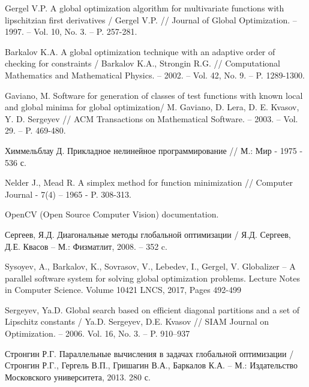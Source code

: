 \documentclass{svproc}
\begin{document}
\begin{thebibliography}{6}
Gergel V.P. A global optimization algorithm for multivariate functions with lipschitzian first derivatives / Gergel V.P. // Journal of Global Optimization. – 1997. – Vol. 10, No. 3. – P. 257-281.

Barkalov K.A. A global optimization technique with an adaptive order of checking for constraints / Barkalov K.A., Strongin R.G. // Computational Mathematics and Mathematical Physics. – 2002. – Vol. 42, No. 9. – P. 1289-1300.

Gaviano, M. Software for generation of classes of test functions with known local and global minima for global optimization/ M. Gaviano, D. Lera, D. E. Kvasov, Y. D. Sergeyev // ACM Transactions on Mathematical Software. – 2003. – Vol. 29. – P. 469-480.

Химмельблау Д. Прикладное нелинейное программирование // М.: Мир - 1975 - 536 с. 

Nelder J., Mead R. A simplex method for function minimization // Computer Journal - 7(4) – 1965 - P. 308-313.

OpenCV (Open Source Computer Vision) documentation. %

Сергеев, Я.Д. Диагональные методы глобальной оптимизации / Я.Д. Сергеев, Д.Е. Квасов – М.: Физматлит, 2008. – 352 c.

Sysoyev, A.,  Barkalov, K.,  Sovrasov, V.,  Lebedev, I.,  Gergel, V. Globalizer – A parallel software system for solving global optimization problems. Lecture Notes in Computer Science. Volume 10421 LNCS, 2017, Pages 492-499

Sergeyev, Ya.D. Global search based on efficient diagonal partitions and a set of Lipschitz constants / Ya.D. Sergeyev, D.E. Kvasov // SIAM Journal on Optimization. – 2006. Vol. 16, No. 3. – P. 910–937

Стронгин Р.Г. Параллельные вычисления в задачах глобальной оптимизации / Стронгин Р.Г., Гергель В.П., Гришагин В.А., Баркалов К.А. – М.: Издательство Московского университета, 2013. 280 с.









\end{thebibliography}
\end{document}
